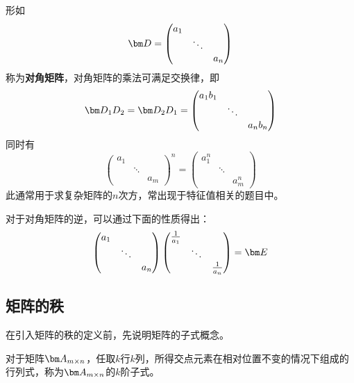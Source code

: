 形如
\[
    \mat{D}=
    \begin{pmatrix}
        a_1 &        &     \\
            & \ddots &     \\
            &        & a_n
    \end{pmatrix}
\]
称为\textbf{\textsf{对角矩阵}}，对角矩阵的乘法可满足交换律，即
\[
    \mat{D_1D_2} = \mat{D_2D_1}
    =
    \begin{pmatrix}
        a_1b_1 &        &        \\
               & \ddots &        \\
               &        & a_nb_n
    \end{pmatrix}
\]
同时有
\begin{equation}
    \begin{pmatrix}
        a_1 &        &     \\
            & \ddots &     \\
            &        & a_m
    \end{pmatrix}^n
    =
    \begin{pmatrix}
        a_1^n &        &       \\
              & \ddots &       \\
              &        & a_m^n
    \end{pmatrix}
\end{equation}
此通常用于求复杂矩阵的$n$次方，常出现于特征值相关的题目中。

对于对角矩阵的逆，可以通过下面的性质得出：
\begin{equation}
    \begin{pmatrix}
        a_1 &        &     \\
            & \ddots &     \\
            &        & a_n
    \end{pmatrix}
    \begin{pmatrix}
        \frac{1}{a_1} &        &               \\
                      & \ddots &               \\
                      &        & \frac{1}{a_n}
    \end{pmatrix}
    = \mat{E}
\end{equation}

\subsection{矩阵的秩}
在引入矩阵的秩的定义前，先说明矩阵的子式概念。
\begin{definition}
    对于矩阵$\mat{A}_{m\times n}$，任取$k$行$k$列，所得交点元素在相对位置不变的情况下组成的行列式，称为$\mat{A}_{m \times n}$的$k$阶子式。
\end{definition}

